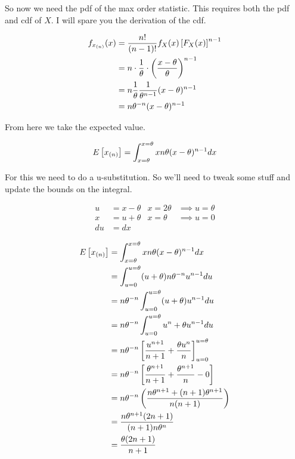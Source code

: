 So now we need the pdf of the max order statistic. This requires both the pdf and cdf of $X$. I will spare you the derivation of the cdf.

\begin{align*}
	f_{x_{(n)}}(x) &= \frac{n!}{(n-1)!} f_{X}(x) \left[ F_X(x) \right]^{n-1} \\
	&= n \cdot \frac{1}{\theta} \cdot \left( \frac{x-\theta}{\theta} \right)^{n-1} \\
	&= n \frac{1}{\theta} \frac{1}{\theta^{n-1}} (x-\theta)^{n-1} \\
	&= n\theta^{-n}(x-\theta)^{n-1}
\end{align*}

From here we take the expected value.

\[
	E\left[ x_{(n)} \right] = \int_{x=\theta}^{x=\theta} xn\theta (x-\theta)^{n-1} dx
\]

For this we need to do a u-substitution. So we'll need to tweak some stuff and update the bounds on the integral.

\vspace{-5mm}
\begin{align*}
	u &= x - \theta & x = 2\theta &\implies u = \theta \\
	x &= u + \theta & x = \theta &\implies u = 0 \\
	du &= dx
\end{align*}

\vspace{-5mm}
\begin{align*}
	E\left[ x_{(n)} \right] &= \int_{x=\theta}^{x=\theta} xn\theta (x-\theta)^{n-1} dx \\
	&= \int_{u=0}^{u=\theta} (u + \theta) n\theta^{-n}u^{n-1} du \\
	&= n\theta^{-n} \int_{u=0}^{u=\theta} (u + \theta) u^{n-1} du \\
	&= n\theta^{-n} \int_{u=0}^{u=\theta} u^n + \theta u^{n-1} du \\
	&= n\theta^{-n}\left[ \frac{u^{n+1}}{n+1} + \frac{\theta u^n}{n} \right]_{u=0}^{u=\theta} \\
	&= n\theta^{-n} \left[ \frac{\theta^{n+1}}{n+1} + \frac{\theta^{n+1}}{n} - 0 \right] \\
	&= n\theta^{-n}\left( \frac{n\theta^{n+1} + (n+1)\theta^{n+1}}{n(n+1)} \right) \\
	&= \frac{n\theta^{n+1}(2n+1)}{(n+1)n\theta^n} \\
	&= \frac{\theta(2n+1)}{n+1}
\end{align*}

